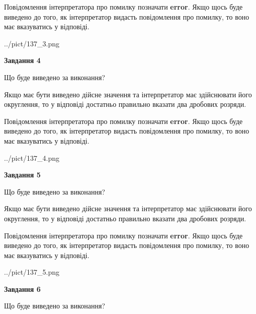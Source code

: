 \documentclass[12pt, ukrainian]{article}
\begin{document}
{\begin {Large}
Повідомлення інтерпретатора про помилку позначати \textbf{error}.
Якщо щось буде виведено до того, як інтерпретатор видасть повідомлення про помилку, 
то воно має вказуватись у відповіді. \par

\begin{center}
	{../pict/137_3.png}
\end{center}
\newpage

{\begin {center}\textbf{Завдання 4}\end {center}}\par
Що буде виведено за виконання? \par

Якщо має бути виведено дійсне значення та інтерпретатор має здійснювати його округлення, 
то у відповіді достатньо правильно вказати два дробових розряди.

Повідомлення інтерпретатора про помилку позначати \textbf{error}.
Якщо щось буде виведено до того, як інтерпретатор видасть повідомлення про помилку, 
то воно має вказуватись у відповіді. \par

\begin{center}
	{../pict/137_4.png}
\end{center}
\newpage

{\begin {center}\textbf{Завдання 5}\end {center}}\par
Що буде виведено за виконання? \par

Якщо має бути виведено дійсне значення та інтерпретатор має здійснювати його округлення, 
то у відповіді достатньо правильно вказати два дробових розряди.

Повідомлення інтерпретатора про помилку позначати \textbf{error}.
Якщо щось буде виведено до того, як інтерпретатор видасть повідомлення про помилку, 
то воно має вказуватись у відповіді. \par

\begin{center}
	{../pict/137_5.png}
\end{center}
\newpage

{\begin {center}\textbf{Завдання 6}\end {center}}\par
Що буде виведено за виконання? \par


\end{Large}}
\end{document}
